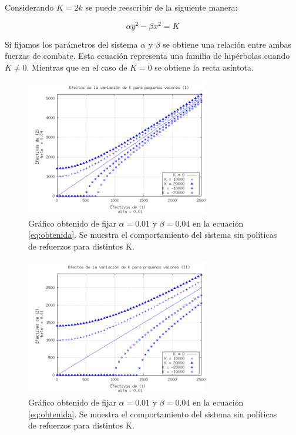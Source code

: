 \documentclass{sig-alternate}
\begin{document}
Considerando $K=2k$ se puede reescribir de la siguiente manera:

\begin{equation}
\alpha y^{2}-\beta x^{2}=K\label{eq:obtenida}\end{equation}

Si fijamos los parámetros del sistema $\alpha$ y $\beta$ se obtiene una relación entre ambas fuerzas de combate. Esta ecuación representa una familia de hip\'erbolas cuando $K \ne 0$. Mientras que en el caso de $K = 0$ se obtiene la recta asíntota.
\begin{figure}[h]
\begin{center}
\includegraphics[width=8cm]{power_areas_1}
\caption{\label{fig:powerarea1} Gr\'afico obtenido de fijar $\alpha = 0.01$ y $\beta = 0.04$ en la ecuación \ref{eq:obtenida}. Se muestra el comportamiento del sistema sin políticas de refuerzos para distintos K.}
\end{center}
\end{figure}
\begin{figure}[h]
\begin{center}
\includegraphics[width=8cm]{power_areas_2}
\caption{\label{fig:powerarea2} Gr\'afico obtenido de fijar $\alpha = 0.01$ y $\beta = 0.04$ en la ecuación \ref{eq:obtenida}. Se muestra el comportamiento del sistema sin políticas de refuerzos para distintos K.}
\end{center}
\end{figure}
\end{document}
